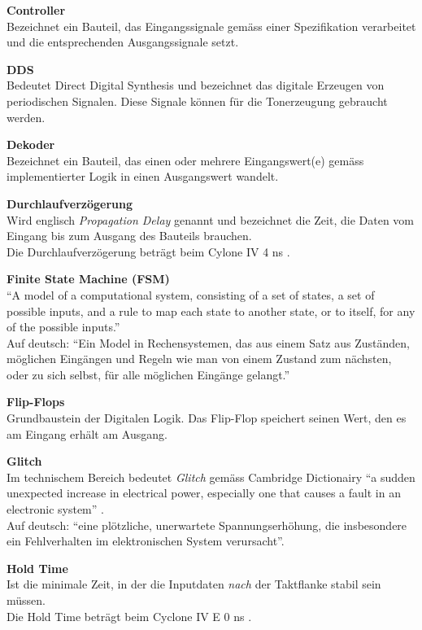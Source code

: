 \textbf{Controller}\\
Bezeichnet ein Bauteil, das Eingangssignale gemäss einer Spezifikation verarbeitet und die entsprechenden Ausgangssignale setzt.

\textbf{DDS}\\
Bedeutet Direct Digital Synthesis und bezeichnet das digitale Erzeugen von periodischen Signalen. Diese Signale können für die Tonerzeugung gebraucht werden.

\textbf{Dekoder}\\
Bezeichnet ein Bauteil, das einen oder mehrere Eingangswert(e) gemäss implementierter Logik in einen Ausgangswert wandelt.

\textbf{Durchlaufverzögerung}\\
Wird englisch \textit{Propagation Delay} genannt und bezeichnet die Zeit, die Daten vom Eingang bis zum Ausgang des Bauteils brauchen.\\
Die Durchlaufverzögerung beträgt beim Cylone IV 4 ns \citep{Handbook_Altera}.

\textbf{Finite State Machine (FSM)}\\
``A model of a computational system, consisting of a set of states, a set of possible inputs, and a rule to map each state to another state, or to itself, for any of the possible inputs.'' \citep{fsm}\\
Auf deutsch: ``Ein Model in Rechensystemen, das aus einem Satz aus Zuständen, möglichen Eingängen und Regeln wie man von einem Zustand zum nächsten, oder zu sich selbst, für alle möglichen Eingänge gelangt.''

\textbf{Flip-Flops}\\
Grundbaustein der Digitalen Logik. Das Flip-Flop speichert seinen Wert, den es am Eingang erhält am Ausgang.

\textbf{Glitch}\\
Im technischem Bereich bedeutet \textit{Glitch} gemäss Cambridge Dictionairy ``a sudden unexpected increase in electrical power, especially one that causes a fault in an electronic system'' \citep{dictionair}.\\
Auf deutsch: ``eine plötzliche, unerwartete Spannungserhöhung, die insbesondere ein Fehlverhalten im elektronischen System verursacht''.

\textbf{Hold Time}\\
Ist die minimale Zeit, in der die Inputdaten \textit{nach} der Taktflanke stabil sein müssen.\\
Die Hold Time beträgt beim  Cyclone IV E 0 ns \citep{Handbook_Altera}.

